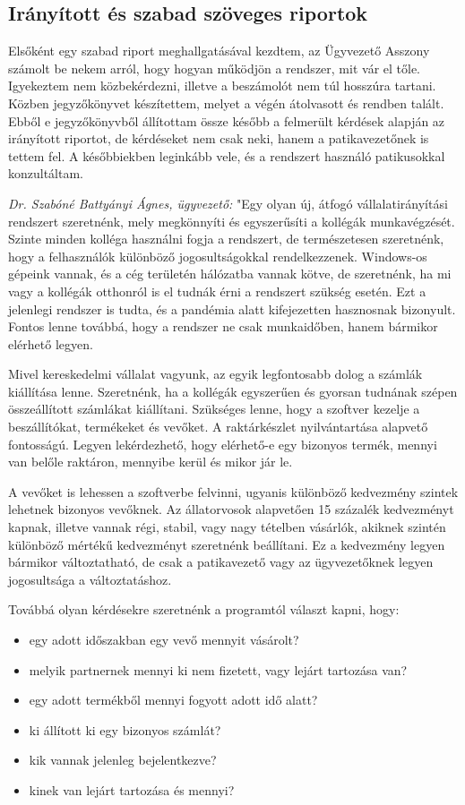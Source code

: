 \documentclass[12pt]{article}
\begin{document}
\subsection{ Irányított és szabad szöveges riportok}

Elsőként egy szabad riport meghallgatásával kezdtem, az Ügyvezető Asszony számolt be nekem arról, hogy hogyan működjön a rendszer, mit vár el tőle. Igyekeztem nem közbekérdezni, illetve a beszámolót nem túl hosszúra tartani. Közben jegyzőkönyvet készítettem, melyet a végén átolvasott és rendben talált. Ebből e jegyzőkönyvből állítottam össze később a felmerült kérdések alapján az irányított riportot, de kérdéseket nem csak neki, hanem a patikavezetőnek is tettem fel. A későbbiekben leginkább vele, és a rendszert használó patikusokkal konzultáltam.

\textit{Dr. Szabóné Battyányi Ágnes, ügyvezető: }"Egy olyan új, átfogó vállalatirányítási rendszert szeretnénk, mely megkönnyíti és egyszerűsíti a kollégák munkavégzését. Szinte minden kolléga használni fogja a rendszert, de természetesen szeretnénk, hogy a felhasználók különböző jogosultságokkal rendelkezzenek. Windows-os gépeink vannak, és a cég területén hálózatba vannak kötve, de szeretnénk, ha mi vagy a kollégák otthonról is el tudnák érni a rendszert szükség esetén. Ezt a jelenlegi rendszer is tudta, és a pandémia alatt kifejezetten hasznosnak bizonyult. Fontos lenne továbbá, hogy a rendszer ne csak munkaidőben, hanem bármikor elérhető legyen.

Mivel kereskedelmi vállalat vagyunk, az egyik legfontosabb dolog a számlák kiállítása lenne. Szeretnénk, ha a kollégák egyszerűen és gyorsan tudnának szépen összeállított számlákat kiállítani. Szükséges lenne, hogy a szoftver kezelje a beszállítókat, termékeket és vevőket. A raktárkészlet nyilvántartása alapvető fontosságú. Legyen lekérdezhető, hogy elérhető-e egy bizonyos termék, mennyi van belőle raktáron, mennyibe kerül és mikor jár le.

A vevőket is lehessen a szoftverbe felvinni, ugyanis különböző kedvezmény szintek lehetnek bizonyos vevőknek. Az állatorvosok alapvetően 15 százalék kedvezményt kapnak, illetve vannak régi, stabil, vagy nagy tételben vásárlók, akiknek szintén különböző mértékű kedvezményt szeretnénk beállítani. Ez a kedvezmény legyen bármikor változtatható, de csak a patikavezető vagy az ügyvezetőknek legyen jogosultsága a változtatáshoz. 

Továbbá olyan kérdésekre szeretnénk a programtól választ kapni, hogy:
\begin{itemize}
\item egy adott időszakban egy vevő mennyit vásárolt?
\item melyik partnernek mennyi ki nem fizetett, vagy lejárt tartozása van?
\item egy adott termékből mennyi fogyott adott idő alatt?
\item ki állított ki egy bizonyos számlát?
\item kik vannak jelenleg bejelentkezve?
\item kinek van lejárt tartozása és mennyi?
\end{itemize}
\end{document}
